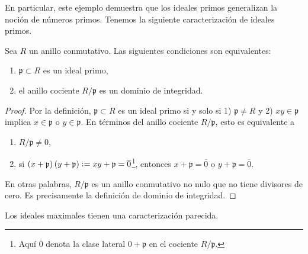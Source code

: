En particular, este ejemplo demuestra que los ideales primos generalizan
la noción de números primos. Tenemos la siguiente caracterización de ideales
primos.

\begin{proposicion}
  Sea $R$ un anillo conmutativo. Las siguientes condiciones son equivalentes:

  \begin{enumerate}
  \item[1)] $\mathfrak{p} \subset R$ es un ideal primo,

  \item[2)] el anillo cociente $R/\mathfrak{p}$ es un dominio de integridad.
  \end{enumerate}

  \begin{proof}
    Por la definición, $\mathfrak{p} \subset R$ es un ideal primo si y solo si
    1) $\mathfrak{p} \ne R$ y 2) $xy \in \mathfrak{p}$ implica
    $x\in \mathfrak{p}$ o $y\in \mathfrak{p}$. En términos del anillo cociente
    $R/\mathfrak{p}$, esto es equivalente a
    \begin{enumerate}
    \item[1)] $R/\mathfrak{p} \ne 0$,

    \item[2)] si
      $(x + \mathfrak{p})\,(y + \mathfrak{p}) \mathrel{\mathop:}= xy + \mathfrak{p} =
      \overline{0}$\footnote{Aquí $\overline{0}$ denota la clase lateral
        $0 + \mathfrak{p}$ en el cociente $R/\mathfrak{p}$.}, entonces
      $x + \mathfrak{p} = \overline{0}$ o $y + \mathfrak{p} = \overline{0}$.
    \end{enumerate}

    En otras palabras, $R/\mathfrak{p}$ es un anillo conmutativo no nulo que no
    tiene divisores de cero. Es precisamente la definición de dominio de
    integridad.
  \end{proof}
\end{proposicion}

Los ideales maximales tienen una caracterización parecida.

